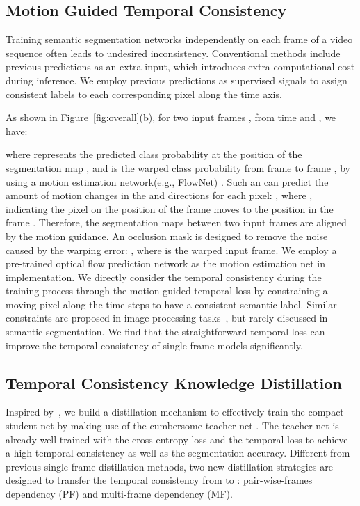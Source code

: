 \documentclass[runningheads]{llncs}
\begin{document}
\subsection{Motion Guided Temporal Consistency}
\label{sec:TL}


Training semantic segmentation networks independently on each frame of a video sequence often leads to undesired inconsistency. Conventional methods include
previous predictions as an extra input, which introduces extra computational cost during inference.
We employ previous predictions as supervised signals to assign consistent labels to each corresponding pixel
along the time axis.

 As shown in Figure~\ref{fig:overall}(b), for two input frames ,  from time  and , we have:

where  represents the predicted class probability at the position  of the segmentation map , and  is the warped class probability from frame  to frame , by using a motion estimation network(e.g., FlowNet) . Such an  can predict the amount of motion changes in the  and  directions for each pixel: ,
where , indicating the pixel on the position  of the frame  moves to the position  in the frame . Therefore,
the segmentation maps between two input frames are aligned by the motion guidance. An occlusion mask  is designed to remove the noise caused by the warping error: , where  is the warped input frame. We employ a pre-trained optical flow prediction network as the motion estimation net in implementation.
We directly consider the temporal consistency during the training process through the motion guided temporal loss by constraining a moving pixel along the time steps to have a consistent semantic label.
Similar constraints are proposed in image processing tasks~\cite{lai2018learning,yao2017occlusion}, but rarely discussed in semantic segmentation. We find that the straightforward temporal loss can improve the temporal consistency of single-frame models significantly.





\subsection{Temporal Consistency Knowledge Distillation }
\label{sec:tckd}

Inspired by~\cite{liu2019structured}, we build a distillation mechanism to effectively train the compact student net  by making use of the cumbersome teacher net . The teacher net  is already well trained with the cross-entropy loss and the temporal loss to achieve a high temporal consistency as well as the segmentation accuracy. Different from previous single frame distillation methods,
two new distillation
strategies
are designed to transfer the temporal consistency from  to : pair-wise-frames dependency (PF) and multi-frame dependency (MF).
\end{document}
